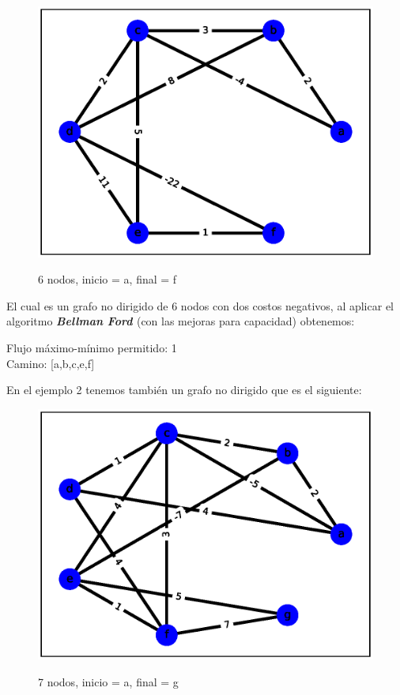 \documentclass{report}
\newcommand{\bell}{{\bfseries {\textit{Bellman Ford }}}}
\begin{document}
\begin{figure}[h!t]
    \centering
    \includegraphics[scale = 0.5]{ejemplo4.eps}
    \label{figura4}
    \caption{6 nodos, inicio = a, final = f}
\end{figure}

El cual es un grafo no dirigido de 6 nodos con dos costos negativos, al aplicar el algoritmo \bell (con las mejoras para capacidad) obtenemos:

\begin{center}
    Flujo máximo-mínimo permitido: 1 \\
    Camino: [a,b,c,e,f]
\end{center}
\newpage
En el ejemplo 2 tenemos también un grafo no dirigido que es el siguiente:

\begin{figure}[h!t]
    \centering
    \includegraphics[scale = 0.5]{ejemplo5.eps}
    \label{figura5}
    \caption{7 nodos, inicio = a, final = g}
\end{figure}
\end{document}
